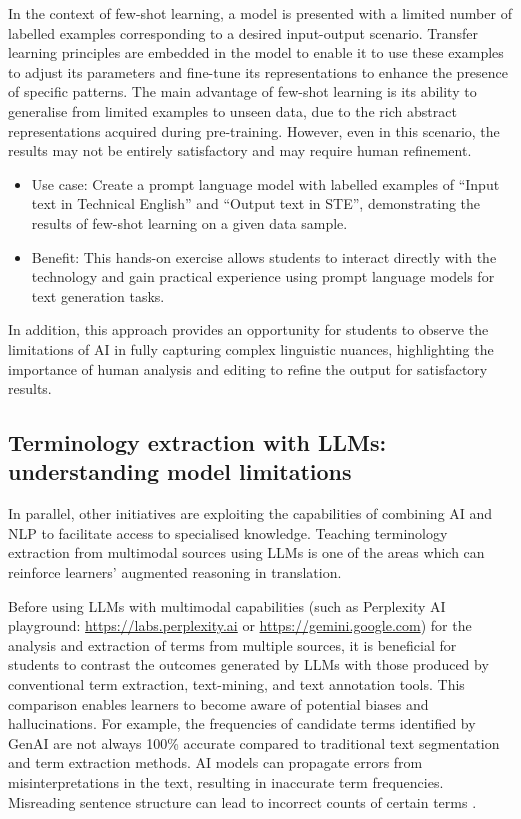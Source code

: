 \documentclass[output=paper]{langscibook}
\begin{document}
In the context of few-shot learning, a model is presented with a limited number of labelled examples corresponding to a desired input-output scenario. Transfer learning principles are embedded in the model to enable it to use these examples to adjust its parameters and fine-tune its representations to enhance the presence of specific patterns. The main advantage of few-shot learning is its ability to generalise from limited examples to unseen data, due to the rich abstract representations acquired during pre-training. However, even in this scenario, the results may not be entirely satisfactory and may require human refinement.

\begin{itemize}
\item Use case: Create a prompt language model with labelled examples of “Input text in Technical English” and “Output text in STE”, demonstrating the results of few-shot learning on a given data sample.
\item Benefit: This hands-on exercise allows students to interact directly with the technology and gain practical experience using prompt language models for text generation tasks.
\end{itemize}
In addition, this approach provides an opportunity for students to observe the limitations of AI in fully capturing complex linguistic nuances, highlighting the importance of human analysis and editing to refine the output for satisfactory results.

\subsection{Terminology extraction with LLMs: understanding model limitations}
In parallel, other initiatives are exploiting the capabilities of combining AI and NLP to facilitate access to specialised knowledge. Teaching terminology extraction from multimodal sources using LLMs is one of the areas which can reinforce learners’ augmented reasoning in translation.

Before using LLMs with multimodal capabilities (such as Perplexity AI playground: \url{https://labs.perplexity.ai} or \url{https://gemini.google.com}) for the analysis and extraction of terms from multiple sources, it is beneficial for students to contrast the outcomes generated by LLMs with those produced by conventional term extraction, text-mining, and text annotation tools. This comparison enables learners to become aware of potential biases and hallucinations. For example, the frequencies of candidate terms identified by GenAI are not always 100\% accurate compared to traditional text segmentation and term extraction methods. AI models can propagate errors from misinterpretations in the text, resulting in inaccurate term frequencies. Misreading sentence structure can lead to incorrect counts of certain terms \citep{uchida24}.
\end{document}
